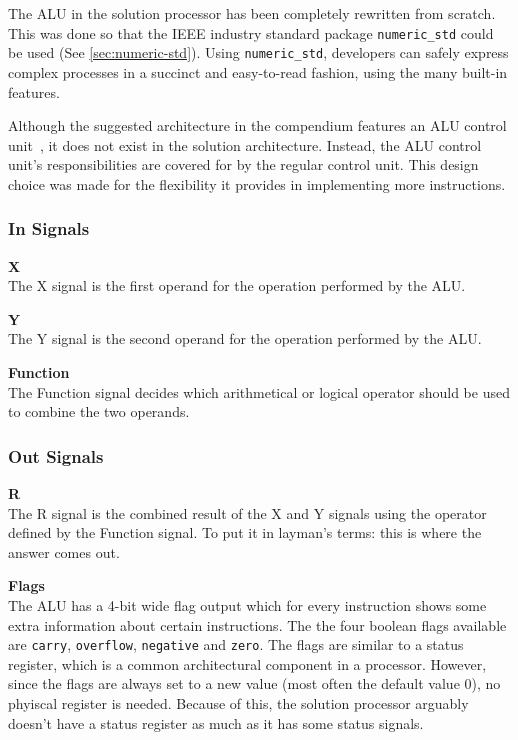 The ALU in the solution processor has been completely rewritten from scratch.
This was done so that the IEEE industry standard package \texttt{numeric\_std} could be used (See \vref{sec:numeric-std}).
Using \texttt{numeric\_std}, developers can safely express complex processes in a succinct and easy-to-read fashion, using the many built-in features.

Although the suggested architecture in the compendium features an ALU control unit~\cite[p.115]{compendium}, it does not exist in the solution architecture.
Instead, the ALU control unit's responsibilities are covered for by the regular control unit.
This design choice was made for the flexibility it provides in implementing more instructions.

\subsubsection{In Signals}

\begin{description}
\item{\textbf{X}} \\
The X signal is the first operand for the operation performed by the ALU.

\item{\textbf{Y}} \\
The Y signal is the second operand for the operation performed by the ALU.

\item{\textbf{Function}} \\
The Function signal decides which arithmetical or logical operator should be used to combine the two operands.
\end{description}

\subsubsection{Out Signals}

\begin{description}
\item{\textbf{R}} \\
The R signal is the combined result of the X and Y signals using the operator defined by the Function signal.
To put it in layman's terms: this is where the answer comes out.

\item{\textbf{Flags}} \\
The ALU has a 4-bit wide flag output which for every instruction shows some extra information about certain instructions.
The the four boolean flags available are \texttt{carry}, \texttt{overflow}, \texttt{negative} and \texttt{zero}.
The flags are similar to a status register, which is a common architectural component in a processor.
However, since the flags are always set to a new value (most often the default value $ 0 $), no phyiscal register is needed.
Because of this, the solution processor arguably doesn't have a status register as much as it has some status signals.

\end{description}
